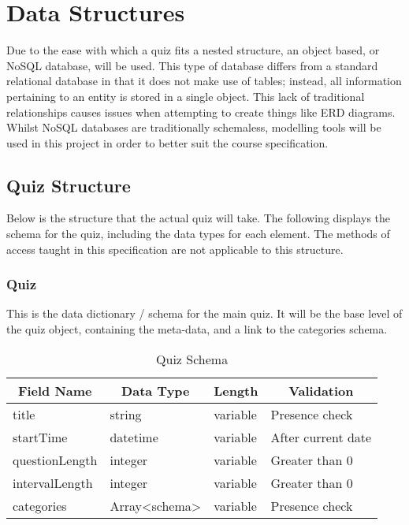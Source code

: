 \section{Data Structures}
Due to the ease with which a quiz fits a nested structure, an object based, or NoSQL database, will be used. This type of database differs from a standard relational database in that it does not make use of tables; instead, all information pertaining to an entity is stored in a single object. This lack of traditional relationships causes issues when attempting to create things like ERD diagrams. Whilst NoSQL databases are traditionally schemaless, modelling tools will be used in this project in order to better suit the course specification.

\subsection{Quiz Structure}
Below is the structure that the actual quiz will take. The following displays the schema for the quiz, including the data types for each element. The methods of access taught in this specification are not applicable to this structure.

\subsubsection{Quiz}
This is the data dictionary / schema for the main quiz. It will be the base level of the quiz object, containing the meta-data, and a link to the categories schema.\\

\begin{table}[!htbp]
\centering
\begin{tabular}{|l|l|l|l|}
\hline
\multicolumn{1}{|c|}{{\bf Field Name}} & \multicolumn{1}{c|}{{\bf Data Type}} & \multicolumn{1}{c|}{{\bf Length}} & \multicolumn{1}{c|}{{\bf Validation}} \\ \hline
title                                  & string                               & variable                          & Presence check                        \\ \hline
startTime                              & datetime                             & variable                          & After current date                    \\ \hline
questionLength                         & integer                              & variable                          & Greater than 0                        \\ \hline
intervalLength                         & integer                              & variable                          & Greater than 0                        \\ \hline
categories                             & Array<schema>                               & variable                          & Presence check                        \\ \hline
\end{tabular}
\caption{Quiz Schema}
\end{table}

